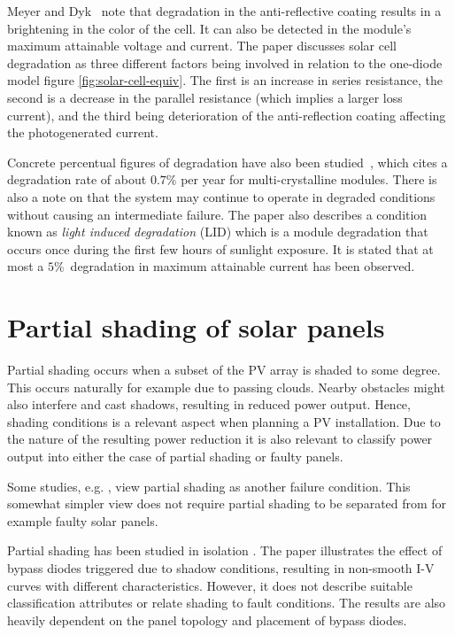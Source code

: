 Meyer and Dyk~\cite{Meyer2004} note that degradation in the anti-reflective coating results in a brightening in the color of the cell.
It can also be detected in the module's maximum attainable voltage and current.
The paper discusses solar cell degradation as three different factors being involved in relation to the one-diode model figure \ref{fig:solar-cell-equiv}.
The first is an increase in series resistance, the second is a decrease in the parallel resistance (which implies a larger loss current), and the third being deterioration of the anti-reflection coating affecting the photogenerated current.

Concrete percentual figures of degradation have also been studied~\cite{Quintana2002}, which cites a degradation rate of about $0.7\%$ per year for multi-crystalline modules.
There is also a note on that the system may continue to operate in degraded conditions without causing an intermediate failure.
The paper also describes a condition known as \emph{light induced degradation} (LID) which is a module degradation
that occurs once during the first few hours of sunlight exposure.
It is stated that at most a $5\%$ degradation in maximum attainable current has been observed.

\section{Partial shading of solar panels}
Partial shading occurs when a subset of the PV array is shaded to some degree.
This occurs naturally for example due to passing clouds.
Nearby obstacles might also interfere and cast shadows, resulting in reduced power output.
Hence, shading conditions is a relevant aspect when planning a PV installation.
Due to the nature of the resulting power reduction it is also relevant to classify power output into either the case of partial shading or faulty panels.

Some studies, e.g. \cite{Stettler2005}, view partial shading as another failure condition.
This somewhat simpler view does not require partial shading to be separated from for example faulty solar panels.

Partial shading has been studied in isolation \cite{Alsayid2013}.
The paper illustrates the effect of bypass diodes triggered due to shadow conditions, resulting in non-smooth I-V curves with different characteristics.
However, it does not describe suitable classification attributes or relate shading to fault conditions.
The results are also heavily dependent on the panel topology and placement of bypass diodes.

